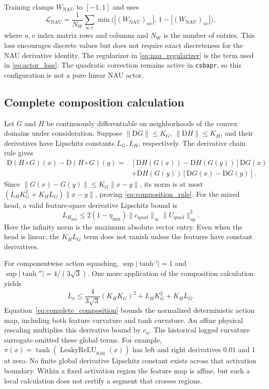 Training clamps \(W_{\mathrm{NAU}}\) to \([-1,1]\) and uses
\begin{equation}
\mathcal L_{\mathrm{NAU}}
=\frac{1}{N_W}\sum_{u,v}
\min\bigl(|(W_{\mathrm{NAU}})_{uv}|,\,
1-|(W_{\mathrm{NAU}})_{uv}|\bigr),
\label{eq:nau_regularizer}
\end{equation}
where \(u,v\) index matrix rows and columns and \(N_W\) is the number of
entries. This loss encourages discrete values but does not require exact
discreteness for the NAU derivative identity.
The regularizer in \eqref{eq:nau_regularizer} is the term used in
\eqref{eq:actor_loss}. The quadratic correction remains active in
\texttt{csbapr}, so this configuration is not a pure linear NAU actor.

\subsection{Complete composition calculation}
\label{app:leff}

Let \(G\) and \(H\) be continuously differentiable on neighborhoods of
the convex domains under consideration. Suppose
\(\|\mathrm DG\|\leq K_G\), \(\|\mathrm DH\|\leq K_H\), and their
derivatives have Lipschitz constants \(L_G,L_H\), respectively.
The derivative chain rule gives
\[
\begin{split}
\mathrm D(H\circ G)(x)-\mathrm D(H\circ G)(y)
={}&[\mathrm DH(G(x))-\mathrm DH(G(y))]\mathrm DG(x)\\
&+\mathrm DH(G(y))[\mathrm DG(x)-\mathrm DG(y)].
\end{split}
\]
Since \(\|G(x)-G(y)\|\leq K_G\|x-y\|\), its norm is at most
\((L_HK_G^2+K_HL_G)\|x-y\|\), proving
\eqref{eq:composition_rule}.
For the mixed head, a valid feature-space derivative Lipschitz bound is
\[
L_{H_{\mathrm{mix}}}
\leq2(1-\eta_{\mathrm{mix}})
\|c_{\mathrm{quad}}\|_\infty\|U_{\mathrm{quad}}\|_{\mathrm{op}}^2.
\]
Here the infinity norm is the maximum absolute vector entry. Even when the
head is linear, the \(K_HL_G\) term does not vanish unless the features
have constant derivatives.

For componentwise action squashing,
\(\sup|\tanh'|=1\) and
\(\sup|\tanh''|=4/(3\sqrt3)\).
One more application of the composition calculation yields
\begin{equation}
L_\pi\leq
\frac{4}{3\sqrt3}(K_HK_G)^2+L_HK_G^2+K_HL_G.
\label{eq:complete_composition}
\end{equation}
Equation~\eqref{eq:complete_composition} bounds the normalized deterministic
action map, including both feature curvature and tanh curvature.
An affine physical rescaling multiplies this derivative bound by \(c_a\).
The historical logged curvature surrogate omitted these global terms.
For example, \(\pi(x)=\tanh(\operatorname{LeakyReLU}_{0.01}(x))\)
has left and right derivatives \(0.01\) and \(1\) at zero. No finite
global derivative Lipschitz constant exists across that activation boundary.
Within a fixed activation region the feature map is affine, but such a
local calculation does not certify a segment that crosses regions.

